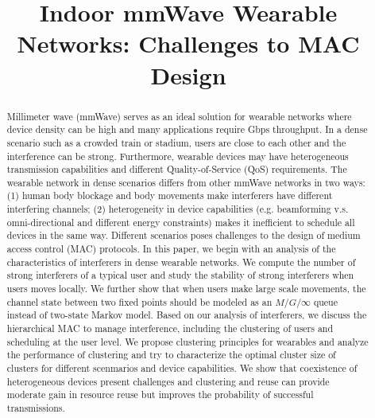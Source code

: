\documentclass[10pt, conference, letterpaper]{IEEEtran}
\begin{document}
\title{Indoor mmWave Wearable Networks: Challenges to MAC Design}

\author{
}

\maketitle

\begin{abstract}
Millimeter wave (mmWave) serves as an ideal solution for wearable networks where device density can be high and many applications require Gbps throughput. In a dense scenario such as a crowded train or stadium, users are close to each other and the interference can be strong. Furthermore, wearable devices may have heterogeneous transmission capabilities and different Quality-of-Service (QoS) requirements. The wearable network in dense scenarios differs from other mmWave networks in two ways: (1) human body blockage and body movements make interferers have different interfering channels; (2) heterogeneity in device capabilities (e.g. beamforming v.s. omni-directional and different energy constraints) makes it inefficient to schedule all devices in the same way. Different scenarios poses challenges to the design of medium access control (MAC) protocols. In this paper, we begin with an analysis of the characteristics of interferers in dense wearable networks. We compute the number of strong interferers of a typical user and study the stability of strong interferers when users moves locally. We further show that when users make large scale movements, the channel state between two fixed points should be modeled as an $M/G/\infty$ queue instead of two-state Markov model. Based on our analysis of interferers, we discuss the hierarchical MAC to manage interference, including the clustering of users and scheduling at the user level. We propose clustering principles for wearables and analyze the performance of clustering and try to characterize the optimal cluster size of clusters for different scenmarios and device capabilities. We show that coexistence of heterogeneous devices present challenges and clustering and reuse can provide moderate gain in resource reuse but improves the probability of successful transmissions. 


\end{abstract}
\IEEEpeerreviewmaketitle
\end{document}
